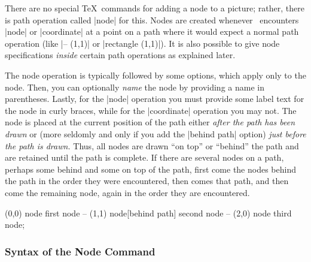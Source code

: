 There are no special \TeX\ commands for adding a node to a picture; rather,
there is path operation called |node| for this. Nodes are created
whenever \tikzname\ encounters |node| or |coordinate| at a point on a
path where it would expect a normal path operation (like |-- (1,1)| or
|rectangle (1,1)|). It is also possible to give node specifications
\emph{inside} certain path operations as explained later.

The node operation is typically followed by some options, which apply
only to the node. Then, you can optionally \emph{name} the node by
providing a name in parentheses. Lastly, for the |node| operation you
must provide some label text for the node in curly braces, while for
the |coordinate| operation you may not. The node is placed at the
current position of the path either \emph{after the path has been
  drawn} or (more seldomly and only if you add the |behind path|
option) \emph{just before the path is drawn.} Thus, all nodes are
drawn ``on top'' or ``behind'' the path and are retained until the
path is complete. If there are several nodes on a path, perhaps some
behind and some on top of the path, first come the nodes behind the
path in the order they were encountered, then comes that path, and
then come the remaining node, again in the order they are
encountered. 

\begin{codeexample}[]
\tikz \fill [fill=yellow!80!black]
     (0,0) node              {first node}  
  -- (1,1) node[behind path] {second node}
  -- (2,0) node              {third node};
\end{codeexample}

\subsubsection{Syntax of the Node Command}

